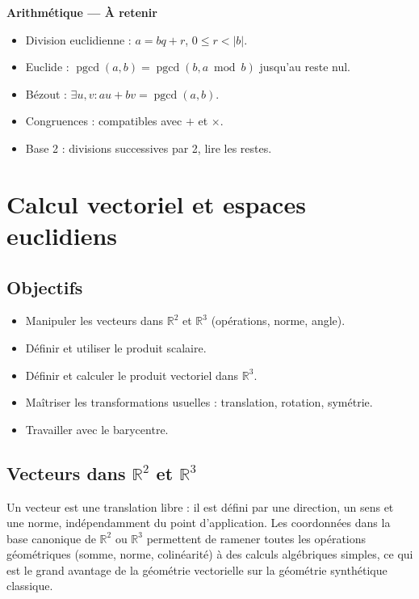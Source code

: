 \documentclass[11pt,a4paper,twoside]{book}
\newcommand{\R}{\mathbb{R}}
\DeclareMathOperator{\pgcd}{pgcd}
\begin{document}
\begin{retenirbox}
\textbf{Arithmétique — À retenir}
\begin{itemize}
  \item Division euclidienne : $a=bq+r$, $0\leq r<|b|$.
  \item Euclide : $\pgcd(a,b)=\pgcd(b,a\bmod b)$ jusqu'au reste nul.
  \item Bézout : $\exists u,v : au+bv=\pgcd(a,b)$.
  \item Congruences : compatibles avec $+$ et $\times$.
  \item Base 2 : divisions successives par 2, lire les restes.
\end{itemize}
\end{retenirbox}

\chapter{Calcul vectoriel et espaces euclidiens}

\section*{Objectifs}
\begin{itemize}[leftmargin=1.5em]
  \item Manipuler les vecteurs dans $\R^2$ et $\R^3$ (opérations, norme, angle).
  \item Définir et utiliser le produit scalaire.
  \item Définir et calculer le produit vectoriel dans $\R^3$.
  \item Maîtriser les transformations usuelles : translation, rotation, symétrie.
  \item Travailler avec le barycentre.
\end{itemize}

\section{Vecteurs dans $\R^2$ et $\R^3$}

Un vecteur est une translation libre : il est défini par une direction, un sens et une norme, indépendamment du point d'application. Les coordonnées dans la base canonique de $\mathbb{R}^2$ ou $\mathbb{R}^3$ permettent de ramener toutes les opérations géométriques (somme, norme, colinéarité) à des calculs algébriques simples, ce qui est le grand avantage de la géométrie vectorielle sur la géométrie synthétique classique.
\end{document}
